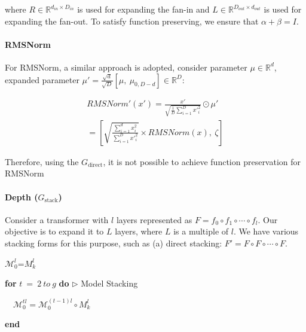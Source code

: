 \documentclass{article}
\begin{document}
\quad

where $R \in \mathbb{R}^{d_{in} \times D_{in}}$ is used for expanding the fan-in and $L \in \mathbb{R}^{D_{out} \times d_{out}}$ is used for expanding the fan-out. To satisfy function preserving, we ensure that $\alpha + \beta = I$.

\paragraph{RMSNorm} For RMSNorm, a similar approach is adopted, consider parameter $\mu \in \mathbb{R}^{d}$, expanded parameter $\mu' = \frac{\sqrt{d}}{\sqrt{D}} [\mu,\ \mu _{0,D-d}] \in \mathbb{R}^D$:

\begin{eqnarray}
RMSNorm'(x') = \frac{x'}{\sqrt{\frac{1}{D}\sum_{i=1}^{D}{x'}_i^2}} \odot \mu' \\
= [ \sqrt{\frac{\sum_{i=1}^{d}{x}_i^2}{\sum_{i=1}^{D}{x'}_i^2}}  \times RMSNorm(x),\ \zeta]
\end{eqnarray}

Therefore, using the $G_{\text{direct}}$, it is not possible to achieve function preservation for RMSNorm

\paragraph{Depth ($G_{\text{stack}}$)}\label{app:stack} Consider a transformer with $l$ layers represented as $F = f_0 \circ f_1 \circ \cdots \circ f_l$. Our objective is to expand it to $L$ layers, where $L$ is a multiple of $l$. We have various stacking forms for this purpose, such as (a) direct stacking: $F' = F \circ F \circ \cdots \circ F$.

\begin{algorithm}[H]
\setcounter{AlgoLine}{0}
$\mathcal{M}_0^{l}$=$M_k^l$

\textbf{for} {$t\ =\ 2\ to\ g$} \textbf{do} \hspace{\fill} $\triangleright$ Model Stacking

$\quad \mathcal{M}_0^{tl} = \mathcal{M}_0^{(t-1)l} \circ M_k^l$

\textbf{end}

\caption{Operator $G_{\text{stack}}$}
\label{alg:stack}
\end{algorithm}
\end{document}
